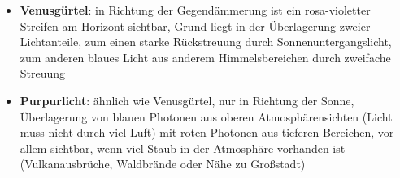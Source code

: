 \begin{itemize}
    \item
    \textbf{Venusgürtel}:
    in Richtung der Gegendämmerung ist ein rosa-violetter Streifen am Horizont
    sichtbar, Grund liegt in der Überlagerung zweier Lichtanteile,
    zum einen starke Rückstreuung durch Sonnenuntergangslicht,
    zum anderen blaues Licht aus anderem Himmelsbereichen durch zweifache
    Streuung

    \item
    \textbf{Purpurlicht}:
    ähnlich wie Venusgürtel, nur in Richtung der Sonne,
    Überlagerung von blauen Photonen aus oberen Atmosphärensichten
    (Licht muss nicht durch viel Luft) mit roten Photonen aus tieferen
    Bereichen, vor allem sichtbar, wenn viel Staub in der Atmosphäre vorhanden
    ist (Vulkanausbrüche, Waldbrände oder Nähe zu Großstadt)
\end{itemize}

\pagebreak

